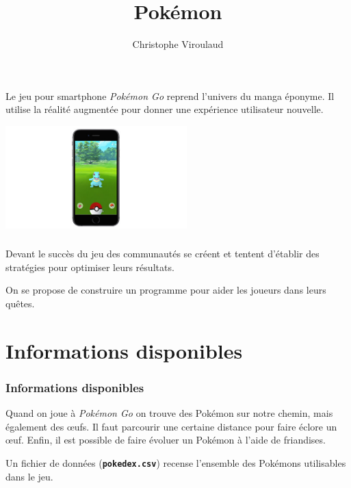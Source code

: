\documentclass[svgnames,11pt]{beamer}
\author[]{Christophe Viroulaud}
\title{Pokémon}
\date{\framebox{\textbf{Tab 02}}}
\institute{Première - NSI}
\begin{document}
\begin{frame}
    \titlepage
\end{frame}

\begin{frame}

    Le jeu pour smartphone \emph{Pokémon Go} reprend l'univers du manga éponyme. Il utilise la réalité augmentée pour donner une expérience utilisateur nouvelle.
    \begin{center}
        \centering
        \includegraphics[width=7cm]{ressources/pokemongo.jpg}
    \end{center}


\end{frame}

\begin{frame}
    \frametitle{}

    Devant le succès du jeu des communautés se créent et tentent d'établir des stratégies pour optimiser leurs résultats.

    \begin{framed}
        \centering On se propose de construire un programme pour aider les joueurs dans leurs quêtes.
    \end{framed}
\end{frame}
\section{Informations disponibles}
\begin{frame}
    \frametitle{Informations disponibles}

    Quand on joue à \emph{Pokémon Go} on trouve des Pokémon sur notre chemin, mais également des œufs. Il faut parcourir une certaine distance pour faire éclore un œuf. Enfin, il est possible de faire évoluer un Pokémon à l'aide de friandises.

    Un fichier de données (\texttt{\textbf{pokedex.csv}}) recense l'ensemble des Pokémons utilisables dans le jeu.

\end{frame}
\end{document}
